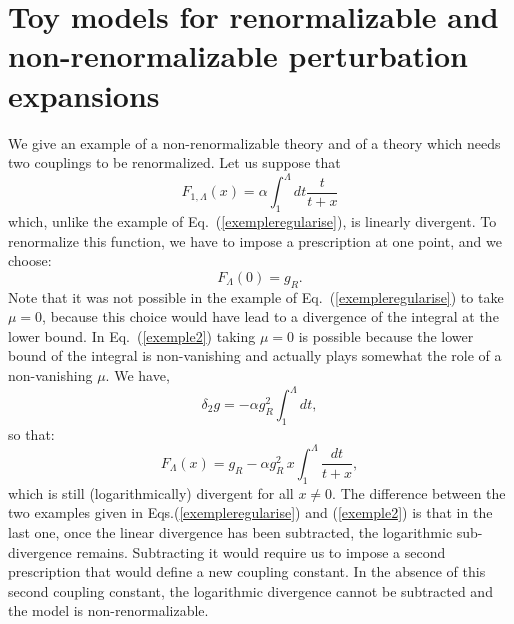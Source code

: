 \documentclass[floatfix,twocolumn,preprintnumbers,amsmath,amssymb,prb]{revtex4}
\begin{document}
{{\section{Toy models for renormalizable and non-renormalizable
perturbation expansions} We give an example of a non-renormalizable
theory and of a theory which needs two couplings to be
renormalized. 
Let us suppose that 
\begin{equation}
F_{1,\Lambda}(x)= \alpha \!\int_1^\Lambda dt \frac{t}{t+x}
\label{exemple2}
\end{equation}
which, unlike the example of Eq.~(\ref{exempleregularise}), is
linearly divergent. To renormalize this function, we have to impose
a prescription at one point, and we choose:
\begin{equation}
F_{\Lambda}(0)= g_R.
\label{pres_exemple2}
\end{equation}
Note that it was not possible in the example 
of Eq.~(\ref{exempleregularise}) to take $\mu=0$, because this
choice would have lead to a divergence of the integral at the lower
bound. In Eq.~(\ref{exemple2}) taking $\mu=0$ is possible
because the lower bound of the integral
is non-vanishing and actually plays somewhat the role of a
non-vanishing $\mu$. We have,
\begin{equation}
\delta_2 g= -\alpha g_R^2 \int_1^\Lambda dt,
\end{equation}
so that:
\begin{equation}
F_{\Lambda}(x)=g_R - \alpha g_R^2\, x\! \int_1^\Lambda
\frac{dt}{t+x},
\end{equation}
which is still (logarithmically) divergent for all $x\ne 0$. The
difference between the two examples given in Eqs.(\ref{exempleregularise}) and (\ref{exemple2}) is that in the last one, once
the linear divergence has been subtracted, the logarithmic
sub-divergence remains. Subtracting it would require us to impose a
second prescription that would define a new coupling constant. In
the absence of this second coupling constant, the logarithmic
divergence cannot be subtracted and the model is
non-renormalizable.

}}
\end{document}
